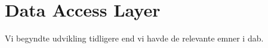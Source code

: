 \section{Data Access Layer}

Vi begyndte udvikling tidligere end vi havde de relevante emner i dab.

